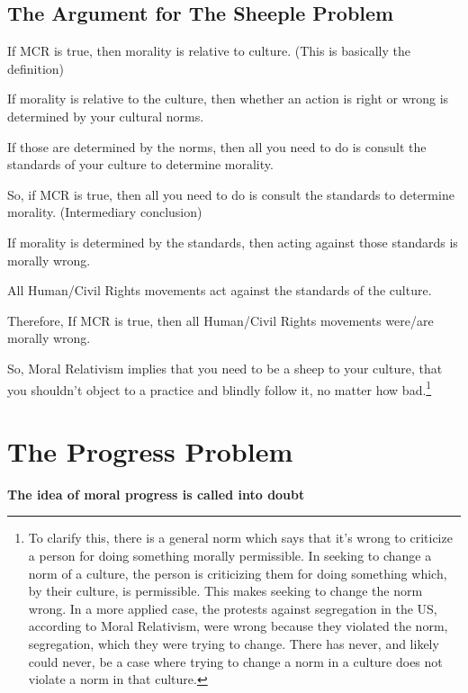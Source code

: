 \subsection{The Argument for The Sheeple Problem}
\begin{earg}
    \item[1] If MCR is true, then morality is relative to culture. (This is basically the definition)
    \item[2] If morality is relative to the culture, then whether an action is right or wrong is determined by your cultural norms.
    \item[3] If those are determined by the norms, then all you need to do is consult the standards of your culture to determine morality.
    \item[4] So, if MCR is true, then all you need to do is consult the standards to determine morality. (Intermediary conclusion)
    \item[5] If morality is determined by the standards, then acting against those standards is morally wrong.
    \item[6] All Human/Civil Rights movements act against the standards of the culture.
    \item[7] Therefore, If MCR is true, then all Human/Civil Rights movements were/are morally wrong.
\end{earg}
So, Moral Relativism implies that you need to be a sheep to your culture, that you shouldn't object to a practice and blindly follow it, no matter how bad.\footnote{To clarify this, there is a general norm which says that it's wrong to criticize a person for doing something morally permissible. In seeking to change a norm of a culture, the person is criticizing them for doing something which, by their culture, is permissible. This makes seeking to change the norm wrong. In a more applied case, the protests against segregation in the US, according to Moral Relativism, were wrong because they violated the norm, segregation, which they were trying to change. There has never, and likely could never, be a case where trying to change a norm in a culture does not violate a norm in that culture.}

\section{The Progress Problem}

\begin{center}
\textbf{The idea of moral progress is called into doubt}
\end{center}


